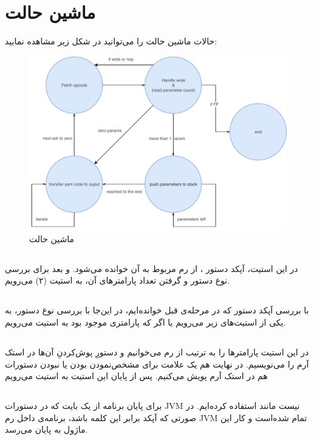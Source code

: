 \section*{
ماشین حالت
}
حالات ماشین حالت را می‌توانید در شکل زیر مشاهده نمایید:
\begin{figure}[H]
	\centering
	\includegraphics[width=0.9\linewidth]{SM}
	\caption{ماشین حالت}
	\label{fig:sm}
\end{figure}
\subsection*{}
در این استیت، آپکد دستور 
،
 از رم مربوط به آن خوانده می‌شود. و بعد برای بررسی نوع دستور و گرفتن تعداد پارامترهای آن، به استیت (۲) می‌رویم. 

\subsection*{}
با بررسی آپکد دستور که در مرحله‌ی قبل خوانده‌ایم، در این‌جا با بررسی نوع دستور، به یکی از استیت‌های زیر می‌رویم یا اگر که پارامتری موجود بود به استیت 
می‌رویم.
\subsection*{}
در این استیت پارامترها را به ترتیب از رم می‌خوانیم و دستورِ پوش‌کردنِ آن‌ها در استک آرم را می‌نویسیم. در نهایت هم یک علامت برای مشخص‌نمودن 
بودن یا نبودن دستورات هم در استک آرم پویش می‌کنیم. پس از پایان این استیت به استیت
می‌رویم
\subsection*{}
برای پایان برنامه از یک بایت که در دستورات JVM نیست
 مانند
استفاده کرده‌ایم. در صورتی که آپکد برابر این کلمه باشد، برنامه‌ی داخل رم JVM تمام شده‌است و کار این ماژول به پایان می‌رسد. 
